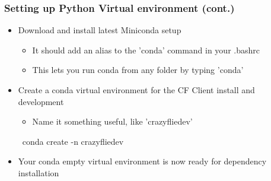 \documentclass[t, xcolor=dvipsnames]{beamer}
\begin{document}
\begin{frame}
	\frametitle{Setting up Python Virtual environment (cont.)}
	\begin{itemize}
		\item Download and install latest Miniconda setup
		\begin{itemize}
			\item It should add an alias to the 'conda' command in your .bashrc
			\item This lets you run conda from any folder by typing 'conda'
		\end{itemize}			
		\item Create a conda virtual environment for the CF Client install and development
		\begin{itemize}
			\item Name it something useful, like 'crazyfliedev'
		\end{itemize}
			\begin{semiverbatim}
			\ conda create -n crazyfliedev
			\end{semiverbatim}
		\item Your conda empty virtual environment is now ready for dependency installation
	\end{itemize}
\end{frame}
\end{document}
